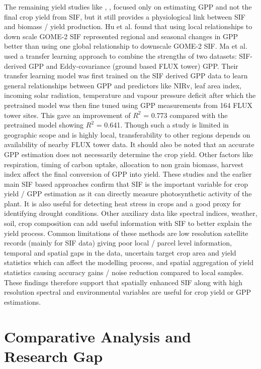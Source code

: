 The remaining yield studies like \cite{hu2020detecting}, \cite{ma2025gpp}, \cite{shekhar2022well} focused only on estimating GPP and not the final crop yield from SIF, but it still provides a physiological link between SIF and biomass / yield production. Hu et al. \cite{hu2020detecting} found that using local relationships to down scale GOME-2 SIF represented regional and seasonal changes in GPP better than using one global relationship to downscale GOME-2 SIF. Ma et al. \cite{ma2025gpp} used a transfer learning approach to combine the strengths of two datasets: SIF-derived GPP and Eddy-covariance (ground based FLUX tower) GPP. Their transfer learning model was first trained on the SIF derived GPP data to learn general relationships between GPP and predictors like NIRv, leaf area index, incoming solar radiation, temperature and vapour pressure deficit after which the pretrained model was then fine tuned using GPP measurements from 164 FLUX tower sites. This gave an improvement of $R^2$ = 0.773 compared with the pretrained model showing  $R^2$ = 0.641. Though such a study is limited in geographic scope and is highly local, transferability to other regions depends on availability of nearby FLUX tower data. It should also be noted that an accurate GPP estimation does not necessarily determine the crop yield. Other factors like respiration, timing of carbon uptake, allocation to non grain biomass, harvest index affect the final conversion of GPP into yield. These studies and the earlier main SIF based approaches confirm that SIF is the important variable for crop yield / GPP estimation as it can directly measure photosynthetic activity of the plant.  It is also useful for detecting heat stress in crops and a good proxy for identifying drought conditions. Other auxiliary data like spectral indices, weather, soil, crop composition can add useful information with SIF to better explain the yield process. Common limitations of these methods are low resolution satellite records (mainly for SIF data) giving poor local / parcel level information, temporal and spatial gaps in the data, uncertain target crop area and yield statistics which can affect the modelling process, and spatial aggregation of yield statistics causing accuracy gains / noise reduction compared to local samples. These findings therefore support that spatially enhanced SIF along with high resolution spectral and environmental variables are useful for crop yield or GPP estimations. 



\section{Comparative Analysis and Research Gap}
\label{sec:comparative_analysis_research_gap}

